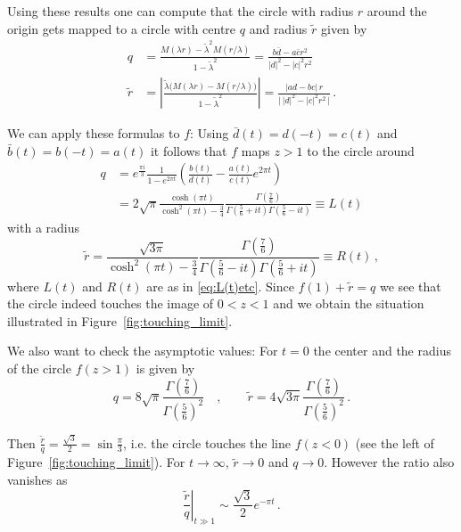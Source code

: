 \documentclass[11pt,a4paper]{article}
\numberwithin{equation}{section}
\begin{document}
\noindent
Using these results one can compute that the circle with radius $r$ around the origin gets mapped to a circle with centre $q$ and radius $\tilde r$ given by
%
\begin{align}
    q &= \frac{M(\lambda r)- \tilde{\lambda}^2 M(r/\lambda)}{1-\tilde{\lambda}^2} = \frac{b \bar{d} - a \bar{c} r^2}{|d|^2 - |c|^2  r^2}
    \nonumber\\
    \tilde{r} &= \left| \frac{\tilde{\lambda} \big(M(\lambda r)-M(r/\lambda) \big)}{1-\tilde{\lambda}^2} \right| = \frac{|ad-bc|\,r}{\big|\,|d|^2-|c|^2 r^2\,\big| }\,.
\end{align}

\noindent 
We can apply these formulas to $f$: Using $\bar{d}(t) = d(-t) = c(t)$ and $\bar{b}(t) = b(-t) = a(t)$ it follows that $f$ maps $z>1$ to the circle around
%
\begin{align}
    q &= e^{\frac{\pi i}{3}}\frac{1}{1-e^{2\pi t}}\left(\frac{b(t)}{d(t)}-\frac{a(t)}{c(t)}e^{2\pi t}\right)
    \nonumber\\
    &= 2\sqrt{\pi} \frac{\cosh(\pi t)}{\cosh^2(\pi t)-\frac{3}{4}} \frac{\Gamma\left(\frac{7}{6}\right)}{\Gamma\left(\frac{5}{6}+i t\right)\Gamma\left(\frac{5}{6}-i t\right)} \equiv L(t)
\end{align}
%
with a radius 
%
\begin{equation}
    \tilde{r} = \frac{\sqrt{3\pi}}{\cosh^2(\pi t)-\frac{3}{4}} \frac{\Gamma\left(\frac{7}{6}\right)}{\Gamma\left(\frac{5}{6}- it\right)\Gamma\left(\frac{5}{6}+ it\right)} \equiv R(t)\,,
\end{equation}
%
where $L(t)$ and $R(t)$ are as in \eqref{eq:L(t)etc}.
Since $f(1)+\tilde{r} = q$ we see that the circle indeed touches the image of $0<z<1$ and we obtain the situation illustrated in Figure~\ref{fig:touching_limit}.

We also want to check the asymptotic values: For $t=0$ the center and the radius of the circle $f(z>1)$ is given by
%
\begin{equation}
    q = 8\sqrt{\pi}\frac{\Gamma\left(\frac{7}{6}\right)}{\Gamma\left(\frac{5}{6}\right)^2}
    \quad , \qquad
    \tilde{r} = 4\sqrt{3\pi}\frac{\Gamma\left(\frac{7}{6}\right)}{\Gamma\left(\frac{5}{6}\right)^2}\,.
\end{equation}

\noindent 
Then $\frac{\tilde{r}}{q} = \frac{\sqrt{3}}{2} = \sin\frac{\pi}{3}$, i.e. the circle touches the line $f(z<0)$ (see the left of Figure~\ref{fig:touching_limit}). 
For $t\to \infty$, $\tilde{r}\to 0$ and $q\to 0$. 
However the ratio also vanishes as 
%
\begin{equation}
    \left.\frac{\tilde{r}}{q}\right|_{t\gg 1} \sim \frac{\sqrt{3}}{2} e^{-\pi t}\,.
\end{equation}
\end{document}
